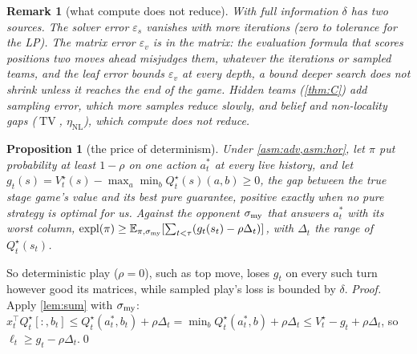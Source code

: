 \documentclass[10pt]{article}
\theoremstyle{tplain}
\newtheorem{proposition}[theorem]{Proposition}
\theoremstyle{tdef}
\theoremstyle{trem}
\newtheorem{remark}[theorem]{Remark}
\newcommand{\E}{\mathbb{E}}
\newcommand{\epss}{\varepsilon_s}
\newcommand{\epsv}{\varepsilon_v}
\newcommand{\etaNL}{\eta_{\mathrm{NL}}}
\newcommand{\Qstar}{Q^\star}
\newcommand{\Vstar}{V^\star}
\DeclareMathOperator{\expl}{expl}
\DeclareMathOperator{\TV}{TV}
\begin{document}
\begin{remark}[what compute does not reduce]\label{rem:leaf}
With full information $\delta$ has two sources. The solver error $\epss$ vanishes with more iterations (zero to tolerance for the LP). The matrix error $\epsv$ is in the matrix: the evaluation formula that scores positions two moves ahead misjudges them, whatever the iterations or sampled teams, and the leaf error bounds $\epsv$ at every depth, a bound deeper search does not shrink unless it reaches the end of the game. Hidden teams (\cref{thm:C}) add sampling error, which more samples reduce slowly, and belief and non-locality gaps ($\TV$, $\etaNL$), which compute does not reduce.
\end{remark}

\begin{proposition}[the price of determinism]\label{prop:det}
Under \cref{asm:adv,asm:hor}, let $\pi$ put probability at least $1-\rho$ on one action $a^\ast_t$ at every live history, and let $g_t(s)=\Vstar_t(s)-\max_a\min_b\Qstar_t(s)(a,b)\ge0$, the gap between the true stage game's value and its best pure guarantee, positive exactly when no pure strategy is optimal for us. Against the opponent $\sigma_{\rm my}$ that answers $a^\ast_t$ with its worst column, $\expl(\pi)\ge\E_{\pi,\sigma_{\rm my}}[\sum_{t<\tau}(g_t(s_t)-\rho\Delta_t)]$, with $\Delta_t$ the range of $\Qstar_t(s_t)$.
\end{proposition}
So deterministic play ($\rho=0$), such as top move, loses $g_t$ on every such turn however good its matrices, while sampled play's loss is bounded by $\delta$. \emph{Proof.} Apply \cref{lem:sum} with $\sigma_{\rm my}$: $x_t^\top\Qstar_t[:,b_t]\le\Qstar_t(a^\ast_t,b_t)+\rho\Delta_t=\min_b\Qstar_t(a^\ast_t,b)+\rho\Delta_t\le\Vstar_t-g_t+\rho\Delta_t$, so $\ell_t\ge g_t-\rho\Delta_t$.\qed
\end{document}
